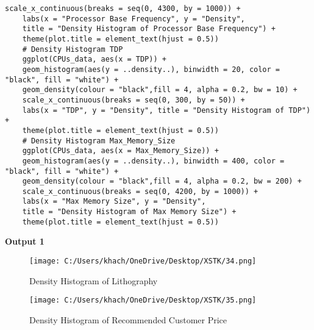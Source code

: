 \documentclass[a4paper]{article}
\begin{document}
\begin{lstlisting}[frame=single, backgroundcolor=\color{gray!10}, breaklines=true, columns=fullflexible]
	scale_x_continuous(breaks = seq(0, 4300, by = 1000)) +
	labs(x = "Processor Base Frequency", y = "Density",
	title = "Density Histogram of Processor Base Frequency") +
	theme(plot.title = element_text(hjust = 0.5))
	# Density Histogram TDP
	ggplot(CPUs_data, aes(x = TDP)) +
	geom_histogram(aes(y = ..density..), binwidth = 20, color = "black", fill = "white") +
	geom_density(colour = "black",fill = 4, alpha = 0.2, bw = 10) +
	scale_x_continuous(breaks = seq(0, 300, by = 50)) +
	labs(x = "TDP", y = "Density", title = "Density Histogram of TDP") +
	theme(plot.title = element_text(hjust = 0.5))
	# Density Histogram Max_Memory_Size
	ggplot(CPUs_data, aes(x = Max_Memory_Size)) +
	geom_histogram(aes(y = ..density..), binwidth = 400, color = "black", fill = "white") +
	geom_density(colour = "black",fill = 4, alpha = 0.2, bw = 200) +
	scale_x_continuous(breaks = seq(0, 4200, by = 1000)) +
	labs(x = "Max Memory Size", y = "Density", 
	title = "Density Histogram of Max Memory Size") +
	theme(plot.title = element_text(hjust = 0.5))
	\end{lstlisting}
	\textbf{Output 1}
	\begin{figure}[htbp]
		\centering
		\begin{minipage}[t]{0.45\textwidth}
			\centering
			\begin{adjustbox}{width=\textwidth, frame}
				\texttt{[image: C:/Users/khach/OneDrive/Desktop/XSTK/34.png]}
			\end{adjustbox}
			\captionsetup{justification=centering}
			\vspace{0.5cm}
			\caption{Density Histogram of Lithography}
		\end{minipage}\hfill
		\begin{minipage}[t]{0.45\textwidth}
			\centering
			\begin{adjustbox}{width=\textwidth, frame}
				\texttt{[image: C:/Users/khach/OneDrive/Desktop/XSTK/35.png]}
			\end{adjustbox}
			\captionsetup{justification=centering}
			\vspace{0.5cm}
			\caption{Density Histogram of
				Recommended Customer Price
			}
		\end{minipage}
	\end{figure}
\end{document}
